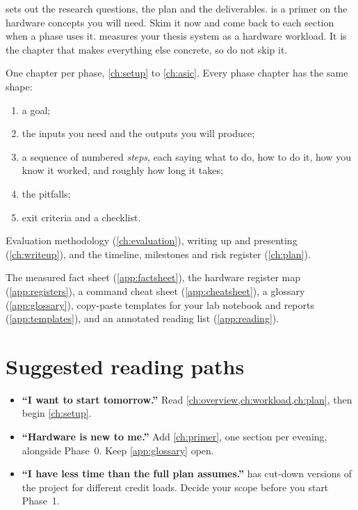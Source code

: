 \begin{description}[leftmargin=0pt,style=nextline]
  \item[Part I --- Foundations (read first)]
   sets out the research questions, the plan and the
  deliverables.  is a primer on the hardware concepts you will
  need. Skim it now and come back to each section when a phase uses it.
   measures your thesis system as a hardware workload. It is
  the chapter that makes everything else concrete, so do not skip it.
  \item[Part II --- The project, step by step]
  One chapter per phase, \cref{ch:setup} to \cref{ch:asic}. Every phase chapter
  has the same shape:
  \begin{enumerate}
    \item a goal;
    \item the inputs you need and the outputs you will produce;
    \item a sequence of numbered \emph{steps}, each saying what to do, how to do
          it, how you know it worked, and roughly how long it takes;
    \item the pitfalls;
    \item exit criteria and a checklist.
  \end{enumerate}
  \item[Part III --- Doing it well]
  Evaluation methodology (\cref{ch:evaluation}), writing up and presenting
  (\cref{ch:writeup}), and the timeline, milestones and risk register
  (\cref{ch:plan}).
  \item[Appendices]
  The measured fact sheet (\cref{app:factsheet}), the hardware register map
  (\cref{app:registers}), a command cheat sheet (\cref{app:cheatsheet}), a
  glossary (\cref{app:glossary}), copy-paste templates for your lab notebook and
  reports (\cref{app:templates}), and an annotated reading list
  (\cref{app:reading}).
\end{description}

\section*{Suggested reading paths}

\begin{itemize}
  \item \textbf{\enquote{I want to start tomorrow.}} Read
        \cref{ch:overview,ch:workload,ch:plan}, then begin \cref{ch:setup}.
  \item \textbf{\enquote{Hardware is new to me.}} Add \cref{ch:primer}, one
        section per evening, alongside Phase~0. Keep \cref{app:glossary} open.
  \item \textbf{\enquote{I have less time than the full plan assumes.}}
         has cut-down versions of the project for different
        credit loads. Decide your scope before you start Phase~1.
\end{itemize}

